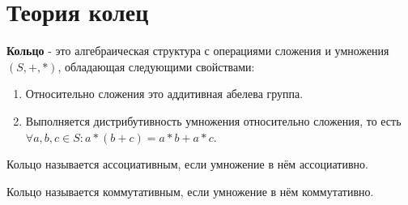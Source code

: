 \section{Теория колец}

\textbf{Кольцо} - это алгебраическая структура с операциями сложения и умножения $(S, +, *)$, обладающая следующими свойствами:
\begin{enumerate}
	\item Относительно сложения это аддитивная абелева группа.
	
	\item Выполняется дистрибутивность умножения относительно сложения, то есть $\forall a, b, c \in S : a*(b+c) = a*b + a*c$. 
\end{enumerate}

Кольцо называется ассоциативным, если умножение в нём ассоциативно.

Кольцо называется коммутативным, если умножение в нём коммутативно.